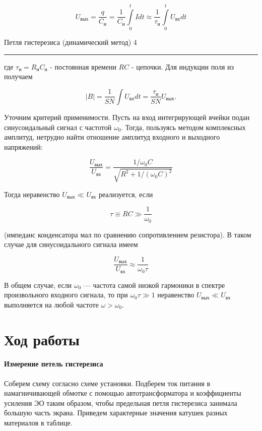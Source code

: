 \documentclass[12pt,a4paper]{scrartcl}
\begin{document}
	$$U_{\text{вых}} = \frac{q}{C_\text{и}} = \frac{1}{C_\text{и}}\int\limits_0^t Idt \approx \frac{1}{\tau_\text{и}} \int\limits_0^t U_{\text{вх}}dt$$
	
	\newpage
	
	
	\begin{flushleft}
		\footnotesize{Петля гистерезиса (динамический метод)} \hspace{\fill} \footnotesize{4}
		\\[-0.3cm]\noindent\rule{\textwidth}{0.3pt}
	\end{flushleft}	
	
где $\tau_\text{и}=R_\text{и}C_\text{и}$ - постоянная времени $ RC $ - цепочки. Для индукции поля из получаем

$$|B|=\frac{1}{SN}\int U_{\text{вх}} dt=\frac{\tau_\text{и}}{SN}U_{\text{вых}}.
$$

Уточним критерий применимости. Пусть на вход интегрирующей ячейки подан синусоидальный сигнал с частотой $\omega_0$. Тогда, пользуясь методом комплексных амплитуд, нетрудно найти отношение амплитуд входного и выходного напряжений: 
	
$$\frac{U_{\text{вых}}}{U_{\text{вх}}}=\frac{1/\omega_0C}{\sqrt{R^2+1/(\omega_0C)^2}}$$
	
Тогда неравенство $U_{\text{вых}} \ll U_{\text{вх}}$ реализуется, если 

$$\tau \equiv RC\gg \frac{1}{\omega_0}$$	
	
(импеданс конденсатора мал по сравнению сопротивлением резистора).
В таком случае для синусоидального сигнала имеем

$$\frac{U_{\text{вых}}}{U_{\text{вх}}}\approx\frac{1}{\omega_0\tau}$$

В общем случае, если $\omega_0$ — частота самой низкой гармоники в спектре
произвольного входного сигнала, то при $\omega_0\tau \gg 1$ неравенство $U_{\text{вых}} \ll U_{\text{вх}}$ выполняется на любой частоте $\omega > \omega_0$.	
	
\section{Ход работы}
\paragraph{Измерение петель гистерезиса} \hfill

Соберем схему согласно схеме установки. Подберем ток питания в намагничивающей обмотке с помощью автотрансформатора и коэффициенты усиления ЭО таким образом, чтобы предельная петля гистерезиса занимала большую часть экрана. Приведем характерные значения катушек разных материалов в таблице.	
\end{document}
